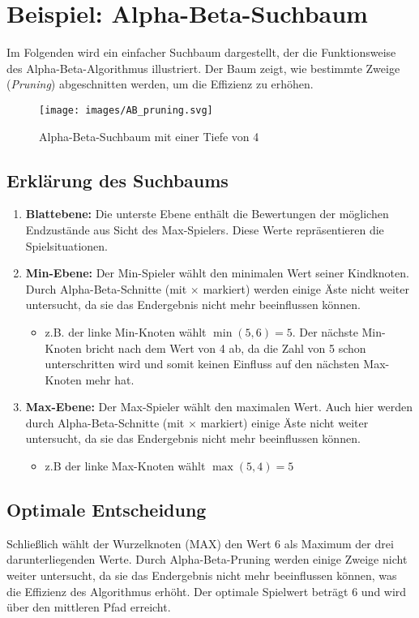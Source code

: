 \section*{Beispiel: Alpha-Beta-Suchbaum}

Im Folgenden wird ein einfacher Suchbaum dargestellt, der die Funktionsweise des Alpha-Beta-Algorithmus illustriert. Der Baum zeigt, wie bestimmte Zweige (\textit{Pruning}) abgeschnitten werden, um die Effizienz zu erhöhen.

\begin{figure}[H]
	\centering
	\texttt{[image: images/AB\_pruning.svg]}
	\caption[Alpha-Beta-Suchbaum: ]{Alpha-Beta-Suchbaum mit einer Tiefe von 4 \autocite{Wikipedia:AlphaBeta}}
	\label{fig:abpruning}
\end{figure}

\subsection*{Erklärung des Suchbaums}

\begin{enumerate} \item \textbf{Blattebene:} Die unterste Ebene enthält die Bewertungen der möglichen Endzustände aus Sicht des Max-Spielers. Diese Werte repräsentieren die Spielsituationen.
	\item \textbf{Min-Ebene:} Der Min-Spieler wählt den minimalen Wert seiner Kindknoten. Durch Alpha-Beta-Schnitte (mit $\times$ markiert) werden einige Äste nicht weiter untersucht, da sie das Endergebnis nicht mehr beeinflussen können. \begin{itemize} \item z.B. der linke Min-Knoten wählt $\min(5, 6) = 5$. Der nächste Min-Knoten bricht nach dem Wert von 4 ab, da die Zahl von 5 schon unterschritten wird und somit keinen Einfluss auf den nächsten Max-Knoten mehr hat.
	\end{itemize}
	\item \textbf{Max-Ebene:} Der Max-Spieler wählt den maximalen Wert. Auch hier werden durch Alpha-Beta-Schnitte (mit $\times$ markiert) einige Äste nicht weiter untersucht, da sie das Endergebnis nicht mehr beeinflussen können. 
	\begin{itemize} \item z.B der linke Max-Knoten wählt $\max(5, 4) = 5$  
	\end{itemize}
\end{enumerate}

\subsection*{Optimale Entscheidung}
Schließlich wählt der Wurzelknoten (MAX) den Wert 6 als Maximum der drei darunterliegenden Werte. Durch Alpha-Beta-Pruning werden einige Zweige nicht weiter untersucht, da sie das Endergebnis nicht mehr beeinflussen können, was die Effizienz des Algorithmus erhöht. Der optimale Spielwert beträgt 6 und wird über den mittleren Pfad erreicht.

